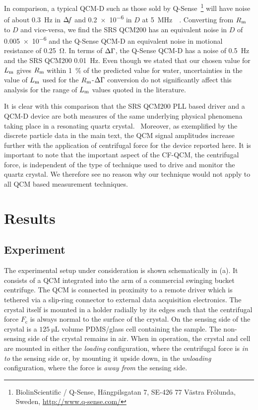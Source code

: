 In comparison, a typical QCM-D such as those sold by
Q-Sense~\footnote{BiolinScientific / Q-Sense, Hängpilsgatan 7, SE-426 77
Västra Frölunda, Sweden,  \url{http://www.q-sense.com/}} will have noise of
about \SI{0.3}{\hertz} in $\Delta\!f$ and \num{0.2e-6} in $D$ at
\SI{5}{\mega\hertz}~\cite{su2005comparison}~\cite{peh2007understanding}.
Converting from $R_\mathrm{m}$ to $D$ and vice-versa, we find the SRS QCM200 has an
equivalent noise in $D$ of \num{0.005e-6} and the Q-Sense QCM-D an
equivalent noise in motional resistance of \SI{0.25}{\ohm}.  In terms of
$\Delta\Gamma$, the Q-Sense QCM-D has a noise of \SI{0.5}{\hertz} and the SRS QCM200
\SI{0.01}{\hertz}.  Even though we stated that our chosen value for $L_\mathrm{m}$
gives $R_\mathrm{m}$ within \SI{1}{\percent} of the predicted value for water,
uncertainties in the value of $L_\mathrm{m}$ used for the $R_\mathrm{m}$-$\Delta\Gamma$ conversion do
not significantly affect this analysis for the range of $L_\mathrm{m}$ values quoted
in the literature.

It is clear with this comparison that the SRS QCM200 PLL based driver and a
QCM-D device are both measures of the same underlying physical phenomena
taking place in a resonating quartz crystal.~\cite{geelhood2002transient}
Moreover, as exemplified by the discrete particle data in the main text,
the QCM signal amplitudes increase further with the application of
centrifugal force for the device reported here.  It is important to note
that the important aspect of the CF-QCM, the centrifugal force, is
independent of the type of technique used to drive and monitor the quartz
crystal.  We therefore see no reason why our technique would not apply to
all QCM based measurement techniques.  



\section*{Results}
\label{sec:experiment}
\subsection*{Experiment}
The experimental setup under consideration is shown schematically in
(a).  It consists of a QCM integrated into the arm of
a commercial swinging bucket centrifuge.  The QCM is connected in proximity
to a remote driver which is tethered via a slip-ring connector to external
data acquisition electronics.  The crystal itself is mounted in a holder
radially by its edges such that the centrifugal force $F_\mathrm{c}$ is
always normal to the surface of the crystal.  On the sensing side of the
crystal is a $\SI{125}{\micro\liter}$ volume PDMS/glass cell containing the
sample.  The non-sensing side of the crystal remains in air.
When in
operation, the crystal and cell are mounted in either the \textit{loading}
configuration, where the centrifugal force is \textit{in to} the sensing
side or, by mounting it upside down, in the \textit{unloading}
configuration, where the force is \textit{away from} the sensing side.

